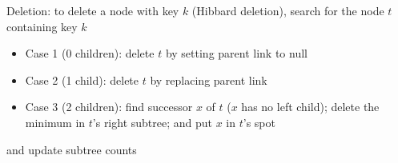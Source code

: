 \documentclass[8pt,a4paper,compress]{beamer}
\begin{document}
\begin{frame}[fragile]
\pause

\begin{minipage}{200pt}
Deletion: to delete a node with key $k$ (Hibbard deletion), search for the node $t$ containing key $k$
\begin{itemize}
\item Case 1 (0 children): delete $t$ by setting parent link to null

\item Case 2 (1 child): delete $t$ by replacing parent link

\item Case 3 (2 children): find successor $x$ of $t$ ($x$ has no left child); delete the minimum in $t$'s right subtree; and put $x$ in $t$'s spot
\end{itemize}
and update subtree counts
\end{minipage}%
\begin{minipage}{100pt}
\begin{center}

\end{center}
\end{minipage}
\end{frame}
\end{document}
